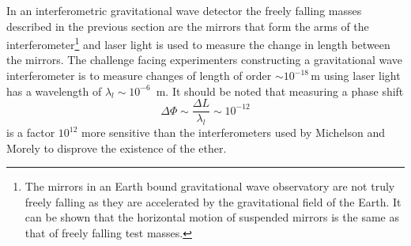 In an interferometric gravitational wave detector the freely falling masses
described in the previous section are the mirrors that form the arms of the
interferometer\footnote{The mirrors in an Earth bound gravitational wave
observatory are not truly freely falling as they are accelerated by the
gravitational field of the Earth. It can be shown that the horizontal motion
of suspended mirrors is the same as that of freely falling test masses.} and
laser light is used to measure the change in length between the mirrors.  The
challenge facing experimenters constructing a gravitational wave
interferometer is to measure changes of length of order $\sim
10^{-18}\,\mathrm{m}$ using laser light has a wavelength of $\lambda_l \sim
10^{-6}$~m.  It should be noted that measuring a phase shift
\begin{equation}
\Delta \Phi \sim \frac{\Delta L}{\lambda_l} \sim 10^{-12}
\end{equation}
is a factor $10^{12}$ more sensitive than the interferometers used by
Michelson and Morely to disprove the existence of the ether.

